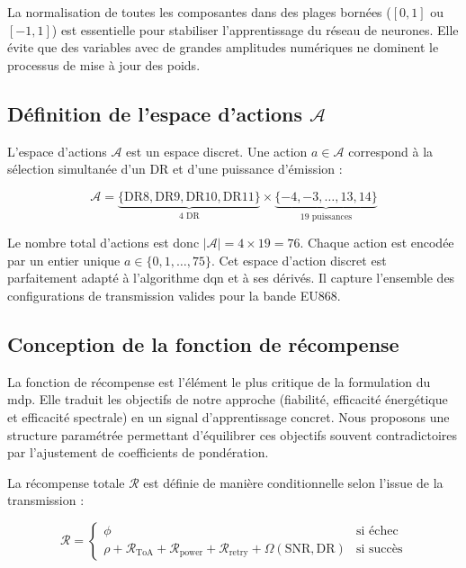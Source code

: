 La normalisation de toutes les composantes dans des plages bornées ($[0, 1]$ ou $[-1, 1]$) est essentielle pour stabiliser l'apprentissage du réseau de neurones. Elle évite que des variables avec de grandes amplitudes numériques ne dominent le processus de mise à jour des poids.

\subsection{\texorpdfstring{Définition de l'espace d'actions $\mathcal{A}$}{Définition de l'espace d'actions}}
\label{subsec:espace-actions}

L'espace d'actions $\mathcal{A}$ est un espace discret. Une action $a \in \mathcal{A}$ correspond à la sélection simultanée d'un DR et d'une puissance d'émission :

\begin{equation}
	\mathcal{A} = \underbrace{\{\text{DR}8, \text{DR}9, \text{DR}10, \text{DR}11\}}_{4 \text{ DR}} \times \underbrace{\{-4, -3, \dots, 13, 14\}}_{19 \text{ puissances}}
\end{equation}

Le nombre total d'actions est donc $|\mathcal{A}| = 4 \times 19 = 76$. Chaque action est encodée par un entier unique $a \in \{0, 1, \dots, 75\}$. Cet espace d'action discret est parfaitement adapté à l'algorithme \gls{dqn} et à ses dérivés. Il capture l'ensemble des configurations de transmission valides pour la bande EU868.

\subsection{Conception de la fonction de récompense}
\label{subsec:fonction-recompense}

La fonction de récompense est l'élément le plus critique de la formulation du \gls{mdp}. Elle traduit les objectifs de notre approche (fiabilité, efficacité énergétique et efficacité spectrale) en un signal d'apprentissage concret. Nous proposons une structure paramétrée permettant d'équilibrer ces objectifs souvent contradictoires par l'ajustement de coefficients de pondération.

La récompense totale $\mathcal{R}$ est définie de manière conditionnelle selon l'issue de la transmission :

\begin{equation}
	\mathcal{R} = 
	\begin{cases} 
		\phi & \text{si échec} \\
		\rho + \mathcal{R}_{\text{ToA}} + \mathcal{R}_{\text{power}} + \mathcal{R}_{\text{retry}} + \Omega(\text{SNR}, \text{DR}) & \text{si succès}
	\end{cases}
\end{equation}

